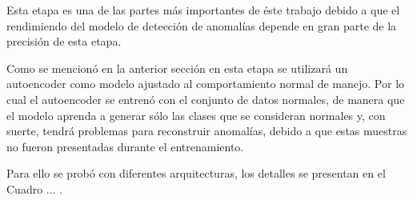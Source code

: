 Esta etapa es una de las partes m\'{a}s importantes de \'{e}ste trabajo debido a que el rendimiendo del modelo de detecci\'{o}n de anomal\'{i}as depende en gran parte de la precisi\'{o}n de esta etapa.

\vspace{5mm} %

Como se mencion\'{o} en la anterior secci\'{o}n en esta etapa se utilizar\'{a} un autoencoder como modelo ajustado al comportamiento normal de manejo. Por lo cual el autoencoder se entren\'{o} con el conjunto de datos normales, de manera que el modelo aprenda a generar s\'{o}lo las clases que se consideran normales y, con suerte, tendr\'{a} problemas para reconstruir anomal\'{i}as, debido a que estas muestras no fueron presentadas durante el entrenamiento.

\vspace{5mm} %

Para ello se prob\'{o} con diferentes arquitecturas, los detalles se presentan en el Cuadro ... .



\vspace{5mm} %



\vspace{5mm} %